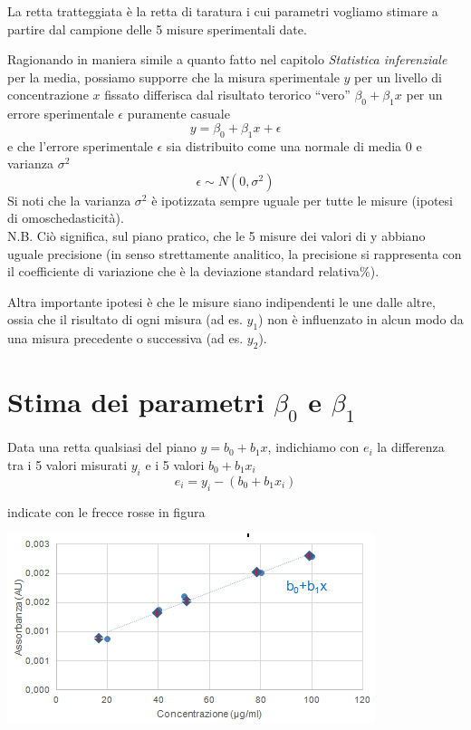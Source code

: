 \documentclass[
  11pt,
]{book}
\begin{document}
La retta tratteggiata è la retta di taratura i cui parametri vogliamo stimare a partire dal campione delle 5 misure sperimentali date.

Ragionando in maniera simile a quanto fatto nel capitolo \emph{Statistica inferenziale} per la media, possiamo supporre che la misura sperimentale \(y\) per un livello di concentrazione \(x\) fissato differisca dal risultato terorico ``vero'' \(\beta_0+\beta_1x\) per un errore sperimentale \(\epsilon\) puramente casuale
\[
y=\beta_0+\beta_1x + \epsilon
\]
e che l'errore sperimentale \(\epsilon\) sia distribuito come una normale di media 0 e varianza \(\sigma^2\)
\[
\epsilon \sim N(0,\sigma^2)
\]
Si noti che la varianza \(\sigma^2\) è ipotizzata sempre uguale per tutte le misure (ipotesi di omoschedasticità).\\
N.B. Ciò significa, sul piano pratico, che le 5 misure dei valori di y abbiano uguale precisione (in senso strettamente analitico, la precisione si rappresenta con il coefficiente di variazione che è la deviazione standard relativa\%).

Altra importante ipotesi è che le misure siano indipendenti le une dalle altre, ossia che il risultato di ogni misura (ad es. \(y_1\))
non è influenzato in alcun modo da una misura precedente o successiva (ad es. \(y_2\)).

\hypertarget{stima-dei-parametri-beta_0-e-beta_1}{%
\section{\texorpdfstring{Stima dei parametri \(\beta_0\) e \(\beta_1\)}{Stima dei parametri \textbackslash beta\_0 e \textbackslash beta\_1}}\label{stima-dei-parametri-beta_0-e-beta_1}}

Data una retta qualsiasi del piano \(y=b_0+b_1x\), indichiamo con \(e_i\) la differenza tra i 5 valori misurati \(y_i\) e i 5 valori \(b_0+b_1x_i\)
\[
e_i=y_i-(b_0+b_1x_i)
\]

indicate con le frecce rosse in figura

\begin{center}\includegraphics[width=0.5\linewidth]{Immagini/Regressione/04_min_sq} \end{center}
\end{document}
